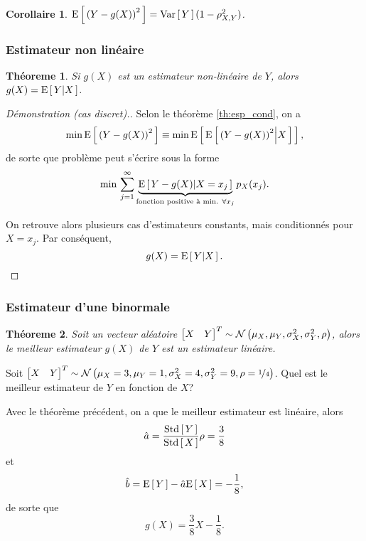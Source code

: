 \documentclass[11pt]{article}
\newcommand\BiNorm[5]{%
	\ensuremath{%
		\mathcal{N}\left(#1,#2,#3,#4,#5\right)%
	}%
}%
\newcommand\Esp[1]{%
	\ensuremath{%
		\mathrm{E}\left[\,#1\,\right]%
	}%
}%
\newcommand\Espg[2]{%
	\ensuremath{%
		\mathrm{E}\left[\,#1\middle\vert#2\,\right]%
	}%
}%
\newcommand\Var[1]{%
	\ensuremath{%
		\mathrm{Var}\left[\,#1\,\right]%
	}%
}%
\newcommand\Std[1]{%
	\ensuremath{%
		\mathrm{Std}\left[\,#1\,\right]%
	}%
}%
\newcommand\Min{%
	\ensuremath{%
		\mathrm{min}\,%
	}%
}%
\newcommand\invec[1]{%
	\ensuremath{%
		\left[%
			\begin{matrix}%
				#1%
			\end{matrix}%
		\right]^T%
	}%
}%
\newtheorem{theoreme}{Théoreme}[section]
\newtheorem*{corollary}{Corollaire}
\theoremstyle{remark}
\theoremstyle{definition}
\begin{document}
\begin{corollary}
	$\Esp{\left(Y-g(X)\right)^2}=\Var{Y}(1-\rho_{X,Y}^2)$.
\end{corollary}

\subsubsection{Estimateur non linéaire}
\begin{theoreme}
	Si $g(X)$ est un estimateur non-linéaire de $Y$, alors $g(X)=\Espg{Y}{X}$.
\end{theoreme}

\begin{proof}[Démonstration (cas discret).]
	Selon le théorème \ref{th:esp_cond}, on a
	\begin{equation*}
		\Min\Esp{\left(Y-g(X)\right)^2}\equiv
		\Min\Esp{\Espg{\left(Y-g(X)\right)^2}{X}},
	\end{equation*}
	de sorte que problème peut s'écrire sous la forme
	\begin{equation*}
		\Min\sum_{j=1}^\infty\underbrace{\Espg{Y-g(X)}{X=x_j}}_{\text{fonction
		positive à min. $\forall x_j$}}p_X(x_j).
	\end{equation*}

	On retrouve alors plusieurs cas d'estimateurs constants, mais conditionnés
	pour $X=x_j$. Par conséquent,
	\begin{equation*}
		g(X)=\Espg{Y}{X}.\qedhere
	\end{equation*}
\end{proof}

\subsubsection{Estimateur d'une binormale}
\begin{theoreme}
	Soit un vecteur aléatoire $\invec{X&Y}\sim\BiNorm{\mu_X}{\mu_Y}{\sigma_X^2}
	{\sigma_Y^2}{\rho}$, alors le meilleur estimateur $g(X)$ de $Y$ est un
	estimateur linéaire.
\end{theoreme}

\begin{exemple}
	Soit $\invec{X&Y}\sim\BiNorm{\mu_X=3}{\mu_Y=1}{\sigma_X^2=4}{\sigma_Y^2=9}
	{\rho=\nicefrac{1}{4}}$. Quel est le meilleur estimateur de $Y$ en fonction
	de $X$?

	Avec le théorème précédent, on a que le meilleur estimateur est linéaire,
	alors
	\begin{equation*}
		\hat{a}=\frac{\Std{Y}}{\Std{X}}\rho=\frac{3}{8}
	\end{equation*}
	et
	\begin{equation*}
		\hat{b}=\Esp{Y}-\hat{a}\Esp{X}=-\frac{1}{8},
	\end{equation*}
	de sorte que
	\begin{equation*}
		g(X)=\frac{3}{8}X-\frac{1}{8}.
	\end{equation*}
\end{exemple}
\end{document}
